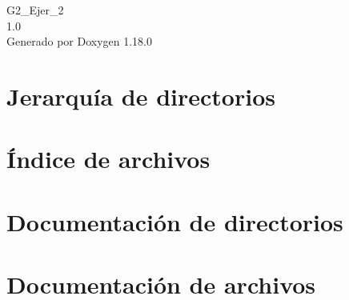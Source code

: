 \documentclass[twoside]{book}
\newcommand{\+}{\discretionary{\mbox{\scriptsize$\hookleftarrow$}}{}{}}
\newcommand{\clearemptydoublepage}{%
    \newpage{\pagestyle{empty}\cleardoublepage}%
  }
\begin{document}
  \raggedbottom
    \hypersetup{pageanchor=false,
                bookmarksnumbered=true,
                pdfencoding=unicode
               }
  \begin{titlepage}
  \vspace*{7cm}
  \begin{center}%
  {\Large G2\+\_\+\+Ejer\+\_\+2}\\
  [1ex]\large 1.\+0 \\
  \vspace*{1cm}
  {\large Generado por Doxygen 1.18.0}\\
  \end{center}
  \end{titlepage}
  \clearemptydoublepage
  \tableofcontents
  \clearemptydoublepage
  \hypersetup{pageanchor=true}

\chapter{Jerarquía de directorios}

\chapter{Índice de archivos}

\chapter{Documentación de directorios}




\chapter{Documentación de archivos}


  \backmatter
  \newpage
  \clearemptydoublepage
  \printindex
\end{document}

